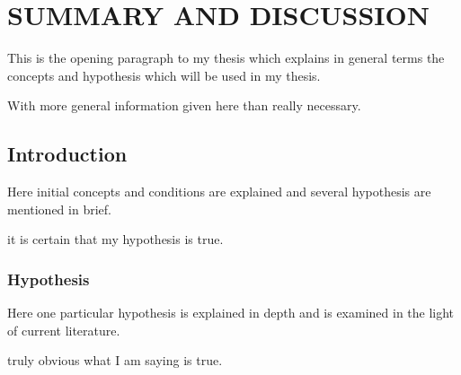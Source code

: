 \chapter{SUMMARY AND DISCUSSION}

This is the opening paragraph to my thesis which
explains in general terms the concepts and hypothesis
which will be used in my thesis.

With more general information given here than really
necessary.

\section{Introduction}

Here initial concepts and conditions are explained and
several hypothesis are mentioned in brief.

it is certain that my hypothesis is true.




\subsection{Hypothesis}

Here one particular hypothesis is explained in depth
and is examined in the light of current literature.

truly obvious what I am saying is true.



